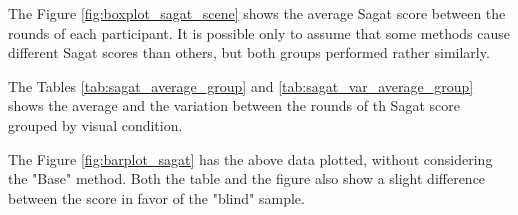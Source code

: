 The Figure \ref{fig:boxplot_sagat_scene} shows the average Sagat score between the rounds of each participant. It is possible only to assume that some methods cause different Sagat scores than others, but both groups performed rather similarly.

%

The Tables \ref{tab:sagat_average_group} and \ref{tab:sagat_var_average_group} shows the average and the variation between the rounds of th Sagat score grouped by visual condition.





The Figure \ref{fig:barplot_sagat} has the above data plotted, without considering the "Base" method. Both the table and the figure also show a slight difference between the score in favor of the "blind" sample.

